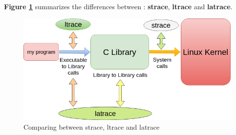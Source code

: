 \begin{itemize}
    
    
\end{itemize}





\textbf{Figure \ref{Comparing between strace, ltrace and latrace}} summarizes the differences between : \textbf{strace}, \textbf{ltrace} and \textbf{latrace}. 
\begin{figure}[H]
		\centering
        \includegraphics[scale=0.40]{img/solution/strace-ltrace-latrace.png}
        \caption{Comparing between strace, ltrace and latrace}
        \label{Comparing between strace, ltrace and latrace}
    \end{figure}


